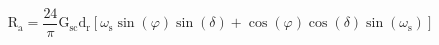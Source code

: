 \documentclass[12pt]{article}
\begin{document}
\begin{displaymath}
\mathrm{R}_{\mathrm{a}}=\frac{24}{\pi} \mathrm{G}_{\mathrm{sc}} \mathrm{d}_{\mathrm{r}}\left[\omega_{\mathrm{s}} \sin (\varphi) \sin (\delta)+\cos (\varphi) \cos (\delta) \sin \left(\omega_{\mathrm{s}}\right)\right]
\end{displaymath}
\end{document}
